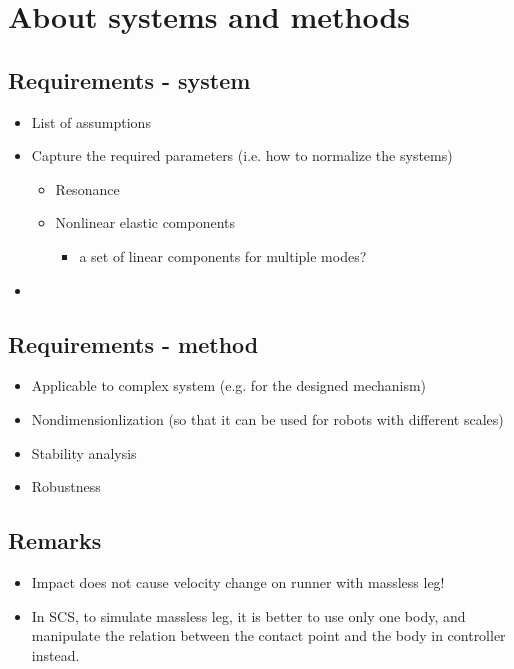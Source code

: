 \section{About systems and methods}
\subsection{Requirements - system}
\begin{itemize}
\item List of assumptions
\item Capture the required parameters (i.e. how to normalize the systems)
	\begin{itemize}
	\item Resonance
	\item Nonlinear elastic components
	\begin{itemize}
	\item a set of linear components for multiple modes? 
	\end{itemize}
	\end{itemize}
	
\item 
\end{itemize}
\subsection{Requirements - method}
\begin{itemize}
\item Applicable to complex system (e.g. for the designed mechanism)
\item Nondimensionlization (so that it can be used for robots with different scales)
\item Stability analysis
\item Robustness
\end{itemize}

\subsection{Remarks}
\begin{itemize}
\item Impact does not cause velocity change on runner with massless leg!
\item In SCS, to simulate massless leg, it is better to use only one body, and manipulate the relation between the contact point and the body in controller instead.
\end{itemize}


